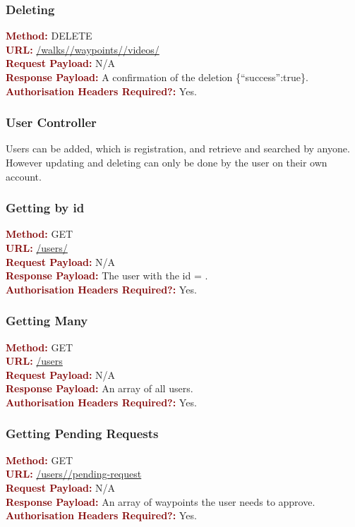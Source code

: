 \documentclass[11pt,a4paper]{report}
\begin{document}
\subsubsection{Deleting}
\textbf{\textcolor{Maroon}{Method:}} DELETE\\
\textbf{\textcolor{Maroon}{URL:}} \url{/walks/}\url{/waypoints/}\url{/videos/}\\
\textbf{\textcolor{Maroon}{Request Payload:}} N/A\\
\textbf{\textcolor{Maroon}{Response Payload:}} A confirmation of the deletion \{``success'':true\}.\\
\textbf{\textcolor{Maroon}{Authorisation Headers Required?:}} Yes.

\subsubsection{User Controller}
Users can be added, which is registration, and retrieve and searched by anyone. However updating and deleting can only be done by the user on their own account.

\subsubsection{Getting by id}
\textbf{\textcolor{Maroon}{Method:}} GET\\
\textbf{\textcolor{Maroon}{URL:}} \url{/users/}\\
\textbf{\textcolor{Maroon}{Request Payload:}} N/A\\
\textbf{\textcolor{Maroon}{Response Payload:}} The user with the id = .\\
\textbf{\textcolor{Maroon}{Authorisation Headers Required?:}} Yes.

\subsubsection{Getting Many}
\textbf{\textcolor{Maroon}{Method:}} GET\\
\textbf{\textcolor{Maroon}{URL:}} \url{/users}\\
\textbf{\textcolor{Maroon}{Request Payload:}} N/A\\
\textbf{\textcolor{Maroon}{Response Payload:}} An array of all users.\\
\textbf{\textcolor{Maroon}{Authorisation Headers Required?:}} Yes.

\subsubsection{Getting Pending Requests}
\textbf{\textcolor{Maroon}{Method:}} GET\\
\textbf{\textcolor{Maroon}{URL:}} \url{/users/}\url{/pending-request}\\
\textbf{\textcolor{Maroon}{Request Payload:}} N/A\\
\textbf{\textcolor{Maroon}{Response Payload:}} An array of waypoints the user needs to approve.\\
\textbf{\textcolor{Maroon}{Authorisation Headers Required?:}} Yes.
\end{document}
